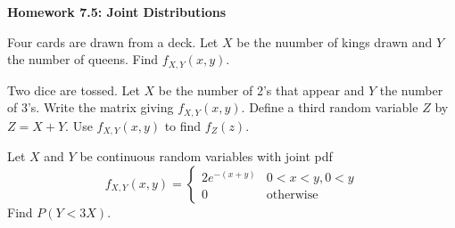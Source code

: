 \documentclass[12pt]{exam}
\def\vs{\vspace{1em}}
\begin{document}
\phantom{i} \vs

\begin{center}
	\begin{large}
          \textbf{Homework 7.5: Joint Distributions}
	\end{large}
\end{center}

\begin{questions}


  \question Four cards are drawn from a deck. Let $X$ be the nuumber
  of kings drawn and $Y$ the number of queens. Find $f_{X,Y}(x,y)$.

  \question Two dice are tossed. Let $X$ be the number of 2's that
  appear and $Y$ the number of 3's. Write the matrix giving
  $f_{X,Y}(x,y)$. Define a third random variable $Z$ by $Z=X+Y$. Use
  $f_{X,Y}(x,y)$ to find $f_Z(z)$.

\question Let $X$ and $Y$ be continuous random variables with joint pdf 
\begin{equation*}
  f_{X,Y}(x,y) = 
  \begin{cases}
    2e^{-(x+y)}& 0<x<y, 0<y\\
    0& \text{otherwise}
  \end{cases}
\end{equation*}
Find $P(Y<3X)$.




\end{questions}
\end{document}
